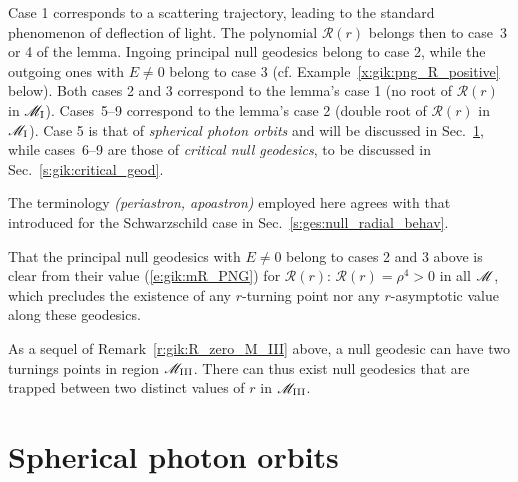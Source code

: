 Case 1 corresponds to a scattering trajectory, leading to the standard phenomenon of deflection of light. The polynomial $\mathcal{R}(r)$
belongs then to case~3 or 4 of the lemma.
Ingoing principal null geodesics belong to case 2, while the outgoing ones with $E\neq 0$ belong to case 3
(cf. Example~\ref{x:gik:png_R_positive} below).
Both cases 2 and 3 correspond to the lemma's case 1 (no root of $\mathcal{R}(r)$ in $\mathscr{M}_{\rm I}$).
Cases~5--9 correspond to the lemma's case 2 (double root of $\mathcal{R}(r)$ in $\mathscr{M}_{\rm I}$).
Case 5 is that of \emph{spherical photon orbits} and will be discussed in Sec.~\ref{s:gik:spherical_orbits}, while cases~6--9 are those of \emph{critical null geodesics},
to be discussed in Sec.~\ref{s:gik:critical_geod}.

\begin{remark}
The terminology  \emph{(periastron, apoastron)} employed here agrees with that
introduced for the Schwarzschild case in Sec.~\ref{s:ges:null_radial_behav}.
\end{remark}

\begin{example} \label{x:gik:png_R_positive}
That the principal null geodesics with $E\neq 0$ belong to cases 2 and 3 above
is clear from their value (\ref{e:gik:mR_PNG}) for $\mathcal{R}(r)$:
$\mathcal{R}(r) = \rho^4 > 0$ in all $\mathscr{M}$, which precludes the existence
of any $r$-turning point nor any $r$-asymptotic value along these geodesics.
\end{example}

\begin{remark}
As a sequel of Remark~\ref{r:gik:R_zero_M_III} above, a null geodesic can have
two turnings points in region $\mathscr{M}_{\rm III}$. There can thus exist null geodesics that are trapped
between two distinct values of $r$ in $\mathscr{M}_{\rm III}$.
\end{remark}




\section{Spherical photon orbits} \label{s:gik:spherical_orbits}

